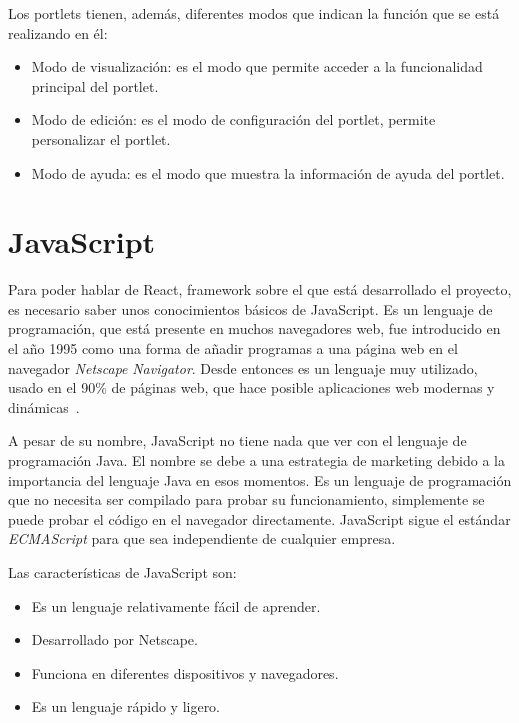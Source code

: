 \documentclass[a4paper, 12pt]{book}
\begin{document}
Los portlets tienen, además, diferentes modos que indican la función que se está realizando en él:
\begin{itemize}
\item Modo de visualización: es el modo que permite acceder a la funcionalidad principal del portlet.
\item Modo de edición: es el modo de configuración del portlet, permite personalizar el portlet.
\item Modo de ayuda: es el modo que muestra la información de ayuda del portlet.
\end{itemize}



\section{JavaScript}
\label{subsec:javascript}
Para poder hablar de React, framework sobre el que está desarrollado el proyecto, es necesario saber unos conocimientos básicos de JavaScript. Es un lenguaje de programación, que está presente en muchos navegadores web, fue introducido en el año 1995 como una forma de añadir programas a una página web en el navegador \textit{Netscape} \textit{Navigator}. Desde entonces es un lenguaje muy utilizado, usado en el 90\% de páginas web, que hace posible aplicaciones web modernas y dinámicas~\cite{js_book}.

\vspace{5mm}
A pesar de su nombre, JavaScript no tiene nada que ver con el lenguaje de programación Java. El nombre se debe a una estrategia de marketing debido a la importancia del lenguaje Java en esos momentos. Es un lenguaje de programación que no necesita ser compilado para probar su funcionamiento, simplemente se puede probar el código en el navegador directamente. JavaScript sigue el estándar \textit{ECMAScript} para que sea independiente de cualquier empresa.

\vspace{5mm}
Las características de JavaScript son:

\begin{itemize}
\item Es un lenguaje relativamente fácil de aprender.
\item Desarrollado por Netscape.
\item Funciona en diferentes dispositivos y navegadores.
\item Es un lenguaje rápido y ligero.
\end{itemize}
\end{document}
